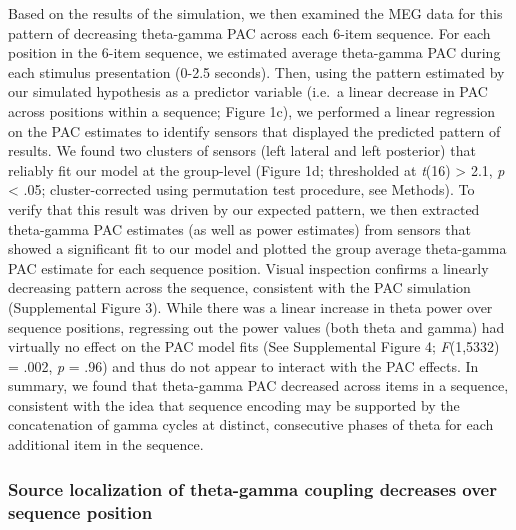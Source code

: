 Based on the results of the simulation, we then examined the MEG data
for this pattern of decreasing theta-gamma PAC across each 6-item
sequence. For each position in the 6-item sequence, we estimated average
theta-gamma PAC during each stimulus presentation (0-2.5 seconds). Then,
using the pattern estimated by our simulated hypothesis as a predictor
variable (i.e.~a linear decrease in PAC across positions within a
sequence; Figure 1c), we performed a linear regression on the PAC
estimates to identify sensors that displayed the predicted pattern of
results. We found two clusters of sensors (left lateral and left
posterior) that reliably fit our model at the group-level (Figure 1d;
thresholded at \emph{t}(16) \textgreater{} 2.1, \emph{p} \textless{}
.05; cluster-corrected using permutation test procedure, see Methods).
To verify that this result was driven by our expected pattern, we then
extracted theta-gamma PAC estimates (as well as power estimates) from
sensors that showed a significant fit to our model and plotted the group
average theta-gamma PAC estimate for each sequence position. Visual
inspection confirms a linearly decreasing pattern across the sequence,
consistent with the PAC simulation (Supplemental Figure 3). While there
was a linear increase in theta power over sequence positions, regressing
out the power values (both theta and gamma) had virtually no effect on
the PAC model fits (See Supplemental Figure 4; \emph{F}(1,5332) = .002,
\emph{p} = .96) and thus do not appear to interact with the PAC effects.
In summary, we found that theta-gamma PAC decreased across items in a
sequence, consistent with the idea that sequence encoding may be
supported by the concatenation of gamma cycles at distinct, consecutive
phases of theta for each additional item in the sequence.

\subsubsection{Source localization of theta-gamma coupling decreases
over sequence
position}\label{source-localization-of-theta-gamma-coupling-decreases-over-sequence-position}

